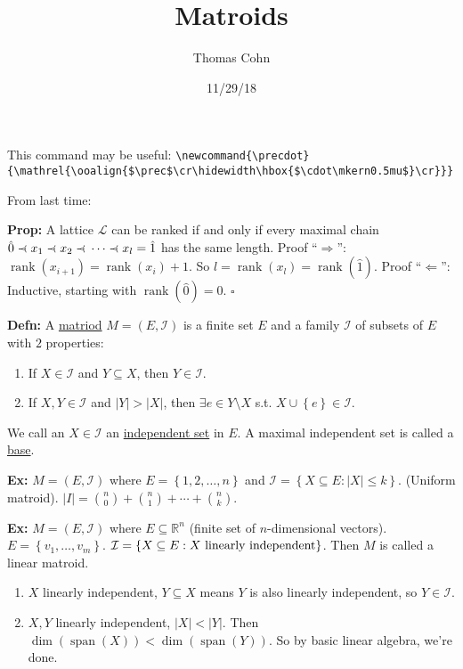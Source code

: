 \documentclass[10pt,letterpaper]{article}
\author{Thomas Cohn}
\title{Matroids}
\date{11/29/18} %
\newcommand{\n}{\hfill\break}
\newcommand{\up}{\vspace{-\baselineskip}}
\newcommand{\defn}[1]{\par\noindent\settowidth{\hangindent}{\textbf{Defn: }}\textbf{Defn: }#1\n}
\newcommand{\prop}[1]{\par\noindent\settowidth{\hangindent}{\textbf{Prop: }}\textbf{Prop: }#1\n}
\newcommand{\ex}[1]{\par\noindent\settowidth{\hangindent}{\textbf{Ex: }}\textbf{Ex: }#1\n}
\newcommand{\proven}{\;$\square$\n}
\newcommand{\ptxt}[1]{\textrm{\textnormal{#1}}}
\newcommand{\card}[1]{\left|#1\right|}
\newcommand{\set}[1]{\left\{#1\right\}}
\newcommand{\reals}{\mathbb{R}}
\newcommand{\R}{\reals}
\newcommand{\precdot}{\mathrel{\ooalign{$\prec$\cr\hidewidth\hbox{$\cdot\mkern0.5mu$}\cr}}}
\DeclareMathOperator{\vspan}{span}
\DeclareMathOperator{\rank}{rank}
\newcommand{\st}{s.t.}
\begin{document}
\maketitle
\setlength\RaggedRightParindent{\parindent}
\RaggedRight

\par\noindent This command may be useful:\n
\verb|\newcommand{\precdot}{\mathrel{\ooalign{$\prec$\cr\hidewidth\hbox{$\cdot\mkern0.5mu$}\cr}}}|

\par\noindent\n
From last time:
\prop{A lattice $\mathcal{L}$ can be ranked if and only if every maximal chain $\hat{0}\precdot{}x_{1}\precdot{}x_{2}\precdot{}\cdots\precdot{}x_{l}=\hat{1}$ has the same length.\n
Proof ``$\Rightarrow$'': $\rank(x_{i+1})=\rank(x_{i})+1$. So $l=\rank(x_{l})=\rank(\hat{1})$.\n
Proof ``$\Leftarrow$'': Inductive, starting with $\rank(\hat{0})=0$.\n
\proven}

\defn{A \underline{matriod} $M=(E,\mathcal{I})$ is a finite set $E$ and a family $\mathcal{I}$ of subsets of $E$ with $2$ properties:
\begin{enumerate}[label=M\arabic*),start=0]
	\item If $X\in\mathcal{I}$ and $Y\subseteq{}X$, then $Y\in\mathcal{I}$.
	\item If $X,Y\in\mathcal{I}$ and $\card{Y}>\card{X}$, then $\exists{}e\in{}Y\setminus{}X$ \st{} $X\cup\set{e}\in\mathcal{I}$.
\end{enumerate}\up\n
We call an $X\in\mathcal{I}$ an \underline{independent set} in $E$. A maximal independent set is called a \underline{base}.}

\ex{$M=(E,\mathcal{I})$ where $E=\set{1,2,\ldots,n}$ and $\mathcal{I}=\set{X\subseteq{}E:\card{X}\le{}k}$. (Uniform matroid).\n
$\card{I}=\binom{n}{0}+\binom{n}{1}+\cdots+\binom{n}{k}$.}

\ex{$M=(E,\mathcal{I})$ where $E\subseteq\R^{n}$ (finite set of $n$-dimensional vectors). $E=\set{v_{1},\ldots,v_{m}}$.\n
$\mathcal{I}=\set{X\subseteq{}E:X\ptxt{ linearly independent}}$. Then $M$ is called a linear matroid.
\begin{enumerate}[label=M\arabic*), start=0]
	\item $X$ linearly independent, $Y\subseteq{}X$ means $Y$ is also linearly independent, so $Y\in\mathcal{I}$.
	\item $X,Y$ linearly independent, $\card{X}<\card{Y}$. Then $\dim(\vspan(X))<\dim(\vspan(Y))$. So by basic linear algebra, we're done.
\end{enumerate}
\up}
\end{document}

